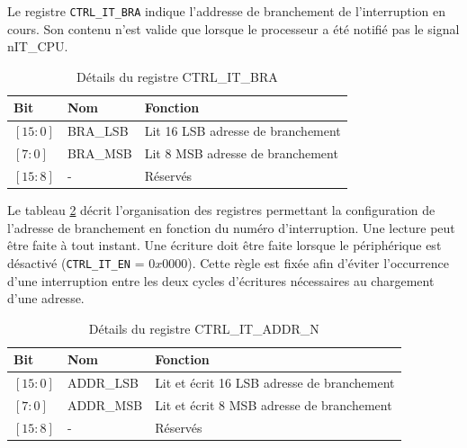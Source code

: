 Le registre \texttt{CTRL\_IT\_BRA} indique l'addresse de branchement de l'interruption en cours.
Son contenu n'est valide que lorsque le processeur a été notifié pas le signal nIT\_CPU.
\begin{table}[H]
	\centering
	\begin{tabular}{lll}
		\toprule
		\textbf{Bit} & \textbf{Nom} & \textbf{Fonction}                 \\ \midrule
		$[15:0]$     & BRA\_LSB     & Lit 16 LSB adresse de branchement \\
		$[7:0]$      & BRA\_MSB     & Lit 8 MSB adresse de branchement  \\
		$[15:8]$     & -            & Réservés                          \\
		\bottomrule
	\end{tabular}
	\caption{Détails du registre CTRL\_IT\_BRA}
	\label{tab:reg_BRA}
\end{table}

Le tableau \ref{tab:reg_ADDR} décrit l'organisation des registres permettant la configuration de l'adresse de branchement en fonction du numéro d'interruption. 
Une lecture peut être faite à tout instant. 
Une écriture doit être faite lorsque le périphérique est désactivé (\texttt{CTRL\_IT\_EN} = $0x0000$).
Cette règle est fixée afin d'éviter l'occurrence d'une interruption entre les deux cycles d'écritures nécessaires au chargement d'une adresse.
\begin{table}[H]
	\centering
	\begin{tabular}{lll}
		\toprule
		\textbf{Bit} & \textbf{Nom} & \textbf{Fonction}                          \\ \midrule
		$[15:0]$     & ADDR\_LSB    & Lit et écrit 16 LSB adresse de branchement \\
		$[7:0]$      & ADDR\_MSB    & Lit et écrit 8 MSB adresse de branchement  \\
		$[15:8]$     & -            & Réservés                                   \\
		\bottomrule
	\end{tabular}
	\caption{Détails du registre CTRL\_IT\_ADDR\_N}
	\label{tab:reg_ADDR}
\end{table}

